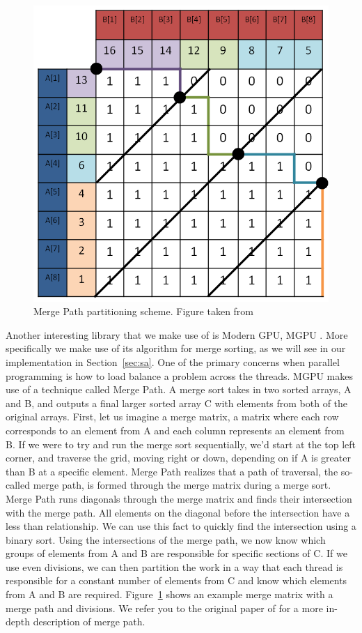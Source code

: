 \begin{figure}[ht!]
\centering
\includegraphics[width=1.0\textwidth]{images/MergePath.png}
\caption{Merge Path partitioning scheme. Figure taken from \cite{odeh2012merge}}
\label{fig:mgpu}
\end{figure}

Another interesting library that we make use of is Modern GPU, MGPU \cite{MGPU}.
More specifically we make use of its algorithm for merge sorting, as we will see in our implementation in Section~\ref{sec:sa}.
One of the primary concerns when parallel programming is how to load balance a problem across the threads.
MGPU makes use of a technique called Merge Path.
A merge sort takes in two sorted arrays, A and B, and outputs a final larger sorted array C with elements from both of the original arrays.
First, let us imagine a merge matrix, a matrix where each row corresponds to an element from A and each column represents an element from B.
If we were to try and run the merge sort sequentially, we'd start at the top left corner, and traverse the grid, moving right or down, depending on if A is greater than B at a specific element.
Merge Path realizes that a path of traversal, the so-called merge path, is formed through the merge matrix during a merge sort.
Merge Path runs diagonals through the merge matrix and finds their intersection with the merge path.
All elements on the diagonal before the intersection have a less than relationship.
We can use this fact to quickly find the intersection using a binary sort.
Using the intersections of the merge path, we now know which groups of elements from A and B are responsible for specific sections of C.
If we use even divisions, we can then partition the work in a way that each thread is responsible for a constant number of elements from C and know which elements from A and B are required.
Figure~\ref{fig:mgpu} shows an example merge matrix with a merge path and divisions.
We refer you to the original paper of \cite{odeh2012merge} for a more in-depth description of merge path.

